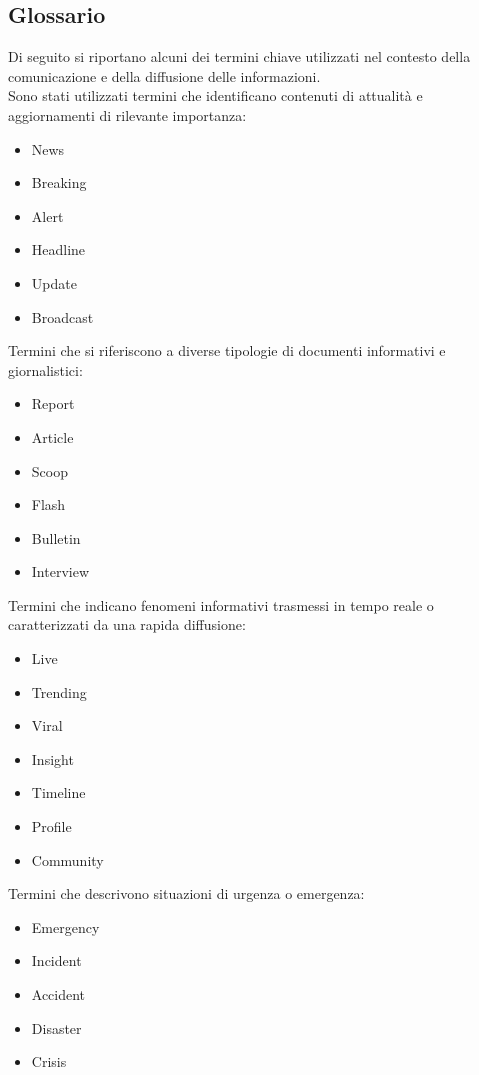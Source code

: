 \documentclass[12pt]{article}
\begin{document}
	\subsection{Glossario}
		Di seguito si riportano alcuni dei termini chiave utilizzati nel contesto della comunicazione e della diffusione delle informazioni.\\
		Sono stati utilizzati termini che identificano contenuti di attualità e aggiornamenti di rilevante importanza:
	\begin{itemize}[label=] 
		\item News
		\item Breaking
		\item Alert
		\item Headline
		\item Update
		\item Broadcast
	\end{itemize}
	Termini che si riferiscono a diverse tipologie di documenti informativi e giornalistici:
	\begin{itemize}[label=] 
		\item Report
		\item Article
		\item Scoop
		\item Flash
		\item Bulletin
		\item Interview
	\end{itemize}
	Termini che indicano fenomeni informativi trasmessi in tempo reale o caratterizzati da una rapida diffusione:
	\begin{itemize}[label=] 
		\item Live
		\item Trending
		\item Viral
		\item Insight
		\item Timeline
		\item Profile
		\item Community
	\end{itemize}
	Termini che descrivono situazioni di urgenza o emergenza:
	\begin{itemize}[label=] 
		\item Emergency
		\item Incident
		\item Accident
		\item Disaster
		\item Crisis
	\end{itemize}
\end{document}
